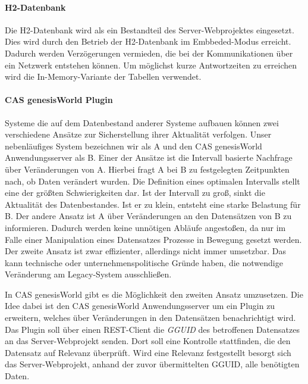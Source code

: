 
\paragraph{H2-Datenbank}

Die H2-Datenbank wird als ein Bestandteil des Server-Webprojektes eingesetzt. Dies wird durch den Betrieb der H2-Datenbank im Embbeded-Modus erreicht. Dadurch werden Verzögerungen vermieden, die bei der Kommunikationen über ein Netzwerk entstehen können. Um möglichst kurze Antwortzeiten zu erreichen wird die In-Memory-Variante der Tabellen verwendet.

\paragraph{CAS genesisWorld Plugin} Systeme die auf dem Datenbestand anderer Systeme aufbauen können zwei verschiedene  Ansätze zur Sicherstellung ihrer Aktualität verfolgen. Unser nebenläufiges System bezeichnen wir als A und den CAS genesisWorld Anwendungsserver als B. Einer der Ansätze ist die Intervall basierte Nachfrage über Veränderungen von A. Hierbei fragt A bei B zu festgelegten Zeitpunkten nach, ob Daten verändert wurden. Die Definition eines optimalen Intervalls stellt eine der größten Schwierigkeiten dar. Ist der Intervall zu groß, sinkt die Aktualität des Datenbestandes. Ist er zu klein, entsteht eine starke Belastung für B. Der andere Ansatz ist A über Veränderungen an den Datensätzen von B zu informieren. Dadurch werden keine unnötigen Abläufe angestoßen, da nur im Falle einer Manipulation eines Datensatzes Prozesse in Bewegung gesetzt werden. Der zweite Ansatz ist zwar effizienter, allerdings nicht immer umsetzbar. Das kann technische oder unternehmenspolitische Gründe haben, die notwendige Veränderung am Legacy-System  ausschließen.  

In CAS genesisWorld gibt es die Möglichkeit den zweiten Ansatz umzusetzen. Die Idee dabei ist den CAS genesisWorld Anwendungsserver um ein Plugin zu erweitern, welches über Veränderungen in den Datensätzen benachrichtigt wird. Das Plugin soll über einen REST-Client die \textit{GGUID} des betroffenen Datensatzes an das Server-Webprojekt senden. Dort soll eine Kontrolle stattfinden, die den Datensatz auf Relevanz überprüft. Wird eine Relevanz festgestellt besorgt sich das Server-Webprojekt, anhand der zuvor übermittelten GGUID, alle benötigten Daten.

